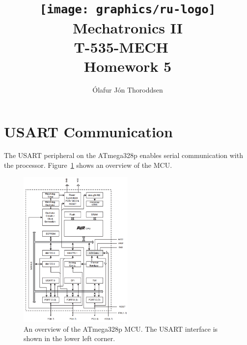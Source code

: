 \documentclass[11pt,a4paper,titlepage]{article}
\author{Ólafur Jón Thoroddsen}  %
\title{\texttt{[image: graphics/ru-logo]}\\\vspace{10mm}
	Mechatronics II\\T-535-MECH \ \\Homework 5}  %
\begin{document}
	\maketitle
	
	\tableofcontents
	\pagebreak
	
	\section{USART Communication}
	The USART peripheral on the ATmega328p enables serial communication with the processor. Figure~\ref{fig:overview} shows an overview of the MCU.
	
	\begin{figure}[h]
		\centering
		\includegraphics[width=0.5\textwidth]{graphics/overview}
		\caption{An overview of the ATmega328p MCU. The USART interface is shown in the lower left corner.}
		\label{fig:overview}
	\end{figure}
	
\end{document}
